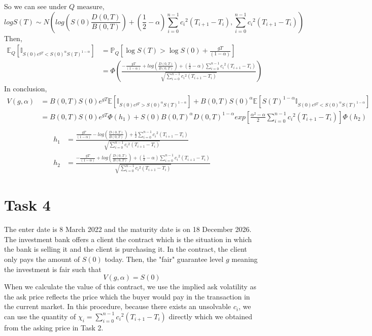 So we can see under \(Q\) measure,
\[log S(T) \sim N \left(log \left( S(0)\frac{D(0,T)}{B(0,T)}\right)+ (\frac{1}{2}-\alpha)\sum_{i=0}^{n-1}{c_i}^2(T_{i+1}-T_{i}),\sum_{i=0}^{n-1} {c_i}^2(T_{i+1}-T_{i})\right)\]
Then,
\begin{align*}
  \mathbb{E}_Q[\mathbb{I}_{S(0)e^{gT}<S(0)^\alpha S(T)^{1-\alpha}}]&= \mathbb{P}_Q[ \log S(T)>\log S(0)+\frac{gT}{(1-\alpha)} ]\\
  &=\Phi\left(\frac{-\frac{gT}{(1-\alpha)}+log \left( \frac{D(0,T)}{B(0,T)}\right)+(\frac{1}{2}-\alpha)\sum_{i=0}^{n-1} {c_i}^2(T_{i+1}-T_{i})}{\sqrt{\sum_{i=0}^{n-1} {c_i}^2(T_{i+1}-T_{i})}}\right)
\end{align*}
In conclusion,
\begin{align*}
    V(g,\alpha)&=B(0,T)S(0)e^{gT}\mathbb{E}[ \mathbb{I}_{S(0)e^{gT}>S(0)^\alpha S(T)^{1-\alpha}}]+ B(0,T)S(0)^\alpha \mathbb{E}[S(T)^{1-\alpha}\mathbb{I}_{S(0)e^{gT}<S(0)^\alpha S(T)^{1-\alpha}}]\\
    &=B(0,T)S(0)e^{gT}\Phi\left(h_1\right)+ S(0)B(0,T)^\alpha D(0,T)^{1-\alpha}    exp\left[\frac{\alpha^2-\alpha}{2}\sum_{i=0}^{n-1} {c_i}^2(T_{i+1}-T_{i})\right]\Phi\left(h_2\right)\\
\end{align*}
\begin{align*}
     h_1 &=\frac{\frac{gT}{(1-\alpha)}-log \left( \frac{D(0,T)}{B(0,T)}\right)+ \frac{1}{2}\sum_{i=0}^{n-1}{c_i}^2(T_{i+1}-T_{i})}{\sqrt{\sum_{i=0}^{n-1} {c_i}^2(T_{i+1}-T_{i})}}\\
   h_2 &=\frac{-\frac{gT}{(1-\alpha)}+log \left( \frac{D(0,T)}{B(0,T)}\right)+ (\frac{1}{2}-\alpha)\sum_{i=0}^{n-1}{c_i}^2(T_{i+1}-T_{i})}{\sqrt{\sum_{i=0}^{n-1} {c_i}^2(T_{i+1}-T_{i})}}
\end{align*}
\newpage
\section*{Task 4}

The enter date is 8 March 2022 and the maturity date is on 18 December 2026. The investment bank offers a client the contract which is the situation in which the bank is selling it and the client is purchasing it.
In the contract, the client only pays the amount of \(S(0)\) today. Then, the "fair" guarantee level \(g\) meaning the investment is fair such that
\[V(g,\alpha)=S(0)\]
When we calculate the value of this contract, we use the implied ask volatility as the ask price reflects the price which the buyer would pay in the transaction in the current market. 
In this procedure, because there exists an unsolvable \(c_i\), we can use the quantity of \(\chi_i=\sum_{i=0}^{n-1} {c_i}^2(T_{i+1}-T_{i})\) directly which we obtained from the asking price in Task 2.


